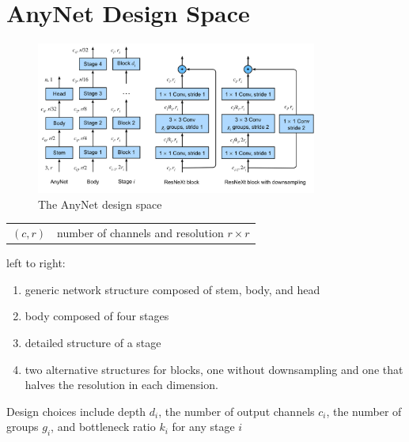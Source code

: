 \section{AnyNet Design Space \cite{dnn-1}} \label{AnyNet Design Space}

\begin{table}[H]
    \begin{minipage}{0.48\linewidth}
        \begin{figure}[H]
            \centering
            \includegraphics[width=\linewidth, height=5cm, keepaspectratio]{Pictures/convolutional-neural-network/anynet.jpg}
            \caption{The AnyNet design space}
        \end{figure}
    \end{minipage}
    \hfill
    \begin{minipage}{0.48\linewidth}
        \begin{customTableWrapper}{1.5}
            \begin{table}[H]
                \centering
                \begin{tabular}{l p{6cm}}
                    $(c,r)$ & number of channels and resolution $\mathit{r} \times \mathit{r}$ \\
                    
                \end{tabular}
            \end{table}
        \end{customTableWrapper}
        left to right:
        \begin{enumerate}
            \item generic network structure composed of stem, body, and head
            \item body composed of four stages
            \item detailed structure of a stage
            \item two alternative structures for blocks, one without downsampling and one that halves the resolution in each dimension. 
        \end{enumerate}

        Design choices include depth $\mathit{d_i}$, the number of output channels $\mathit{c_i}$, the number of groups $\mathit{g_i}$, and bottleneck ratio $\mathit{k_i}$ for any stage $i$
    \end{minipage}
\end{table}




